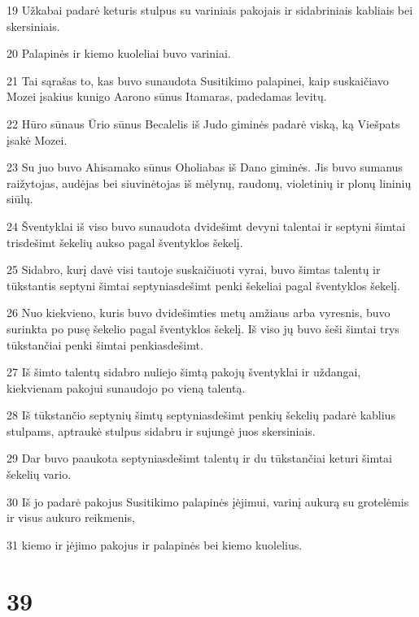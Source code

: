\par 19 Užkabai padarė keturis stulpus su variniais pakojais ir sidabriniais kabliais bei skersiniais. 
\par 20 Palapinės ir kiemo kuoleliai buvo variniai. 
\par 21 Tai sąrašas to, kas buvo sunaudota Susitikimo palapinei, kaip suskaičiavo Mozei įsakius kunigo Aarono sūnus Itamaras, padedamas levitų. 
\par 22 Hūro sūnaus Ūrio sūnus Becalelis iš Judo giminės padarė viską, ką Viešpats įsakė Mozei. 
\par 23 Su juo buvo Ahisamako sūnus Oholiabas iš Dano giminės. Jis buvo sumanus raižytojas, audėjas bei siuvinėtojas iš mėlynų, raudonų, violetinių ir plonų lininių siūlų. 
\par 24 Šventyklai iš viso buvo sunaudota dvidešimt devyni talentai ir septyni šimtai trisdešimt šekelių aukso pagal šventyklos šekelį. 
\par 25 Sidabro, kurį davė visi tautoje suskaičiuoti vyrai, buvo šimtas talentų ir tūkstantis septyni šimtai septyniasdešimt penki šekeliai pagal šventyklos šekelį. 
\par 26 Nuo kiekvieno, kuris buvo dvidešimties metų amžiaus arba vyresnis, buvo surinkta po pusę šekelio pagal šventyklos šekelį. Iš viso jų buvo šeši šimtai trys tūkstančiai penki šimtai penkiasdešimt. 
\par 27 Iš šimto talentų sidabro nuliejo šimtą pakojų šventyklai ir uždangai, kiekvienam pakojui sunaudojo po vieną talentą. 
\par 28 Iš tūkstančio septynių šimtų septyniasdešimt penkių šekelių padarė kablius stulpams, aptraukė stulpus sidabru ir sujungė juos skersiniais. 
\par 29 Dar buvo paaukota septyniasdešimt talentų ir du tūkstančiai keturi šimtai šekelių vario. 
\par 30 Iš jo padarė pakojus Susitikimo palapinės įėjimui, varinį aukurą su grotelėmis ir visus aukuro reikmenis, 
\par 31 kiemo ir įėjimo pakojus ir palapinės bei kiemo kuolelius.



\chapter{39}

